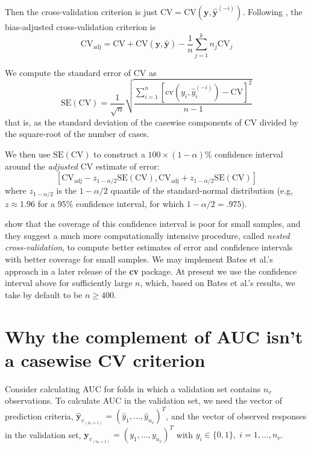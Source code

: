 \documentclass[
]{jss}
\begin{document}
Then the cross-validation criterion is just
\(\mathrm{CV} = \mathrm{CV}(\mathbf{y}, \widehat{\mathbf{y}}^{(-i)})\).
Following \citet[pp.~293--295]{DavisonHinkley:1997}, the bias-adjusted
cross-validation criterion is \[
\mathrm{CV}_{\mathrm{adj}} = \mathrm{CV} + \mathrm{CV}(\mathbf{y}, \widehat{\mathbf{y}}) - \frac{1}{n} \sum_{j=1}^{k} n_j \mathrm{CV}_j
\]

We compute the standard error of CV as \[
\mathrm{SE}(\mathrm{CV}) = \frac{1}{\sqrt n} \sqrt{ \frac{\sum_{i=1}^n \left[ \mathrm{cv}(y_i, \widehat{y}_i^{(-i)} ) - \mathrm{CV} \right]^2 }{n - 1} }
\] that is, as the standard deviation of the casewise components of CV
divided by the square-root of the number of cases.

We then use \(\mathrm{SE}(\mathrm{CV})\) to construct a
\(100 \times (1 - \alpha)\)\% confidence interval around the
\emph{adjusted} CV estimate of error: \[
\left[ \mathrm{CV}_{\mathrm{adj}} - z_{1 - \alpha/2}\mathrm{SE}(\mathrm{CV}), \mathrm{CV}_{\mathrm{adj}} + z_{1 - \alpha/2}\mathrm{SE}(\mathrm{CV})  \right]
\] where \(z_{1 - \alpha/2}\) is the \(1 - \alpha/2\) quantile of the
standard-normal distribution (e.g, \(z \approx 1.96\) for a 95\%
confidence interval, for which \(1 - \alpha/2 = .975\)).

\citet{BatesHastieTibshirani:2023} show that the coverage of this
confidence interval is poor for small samples, and they suggest a much
more computationally intensive procedure, called \emph{nested
cross-validation}, to compute better estimates of error and confidence
intervals with better coverage for small samples. We may implement Bates
et al.'s approach in a later release of the \textbf{cv} package. At
present we use the confidence interval above for sufficiently large
\(n\), which, based on Bates et al.'s results, we take by default to be
\(n \ge 400\).

\hypertarget{why-the-complement-of-auc-isnt-a-casewise-cv-criterion}{%
\section{Why the complement of AUC isn't a casewise CV
criterion}\label{why-the-complement-of-auc-isnt-a-casewise-cv-criterion}}

Consider calculating AUC for folds in which a validation set contains
\(n_v\) observations. To calculate AUC in the validation set, we need
the vector of prediction criteria,
\(\widehat{\mathbf{y}}_{v_{(n_v \times 1)}} = (\widehat{y}_1, ..., \widehat{y}_{n_v})^T\),
and the vector of observed responses in the validation set,
\(\mathbf{y}_{v_{(n_v \times 1)}} = (y_1, \ldots, y_{n_v})^T\) with
\(y_i \in \{0,1\}, \; i = 1, \ldots, n_v\).
\end{document}
